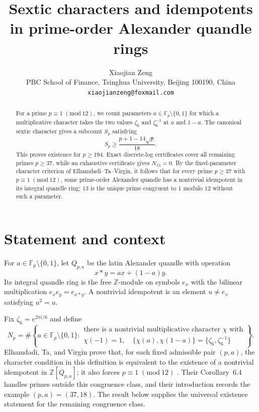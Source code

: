 \documentclass[11pt]{article}
\title{Sextic characters and idempotents in prime-order Alexander quandle rings}
\author{Xiaojian Zeng\\
\small PBC School of Finance, Tsinghua University, Beijing 100190, China\\
\small \texttt{xiaojianzeng@foxmail.com}}
\date{}
\newcommand{\Fp}{\mathbb F_p}
\begin{document}
\maketitle

\begin{abstract}
For a prime $p\equiv1\;(\mathrm{mod}\ 12)$, we count parameters $a\in
\mathbb F_p\setminus\{0,1\}$ for which a multiplicative character takes the
two values $\zeta_6$ and $\zeta_6^{-1}$ at $a$ and $1-a$.  The canonical
sextic character gives a subcount $S_p$ satisfying
\[
 S_p\geq \frac{p+1-14\sqrt p}{18}.
\]
This proves existence for $p\geq194$.  Exact discrete-log certificates cover
all remaining primes $p\geq37$, while an exhaustive certificate gives
$N_{13}=0$.  By the fixed-parameter character criterion of
Elhamdadi--Ta--Virgin, it follows that for every prime $p\geq37$ with
$p\equiv1\;(\mathrm{mod}\ 12)$, some prime-order Alexander quandle has a nontrivial
idempotent in its integral quandle ring; $13$ is the unique prime congruent to
$1$ modulo $12$ without such a parameter.
\end{abstract}

\section{Statement and context}

For $a\in\Fp\setminus\{0,1\}$, let $Q_{p,a}$ be the latin Alexander
quandle with operation
\[
 x*y=ax+(1-a)y.
\]
Its integral quandle ring is the free $\mathbb Z$-module on symbols $e_x$
with the bilinear multiplication $e_xe_y=e_{x*y}$.  A nontrivial idempotent
is an element $u\neq e_x$ satisfying $u^2=u$.

Fix $\zeta_6=e^{2\pi i/6}$ and define
\[
N_p=\#\left\{a\in\Fp\setminus\{0,1\}:\begin{array}{l}
\text{there is a nontrivial multiplicative character }\chi\text{ with}\\[-2pt]
\chi(-1)=1,\quad
\{\chi(a),\chi(1-a)\}=\{\zeta_6,\zeta_6^{-1}\}
\end{array}\right\}.
\]
Elhamdadi, Ta, and Virgin prove that, for each fixed admissible pair $(p,a)$,
the character condition in this definition is equivalent to the existence of
a nontrivial idempotent in $\mathbb Z[Q_{p,a}]$; it also forces
$p\equiv1\;(\mathrm{mod}\ 12)$ \cite[Lemma~6.2 and Theorem~6.3]{ETV2026}.
Their Corollary~6.4 handles primes outside this congruence class, and their
introduction records the example $(p,a)=(37,18)$.  The result below supplies
the universal existence statement for the remaining congruence class.
\end{document}
